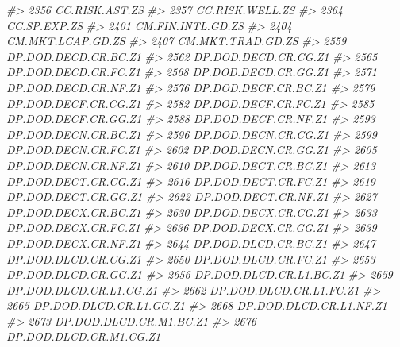 \documentclass[
]{bxjsbook}
\newenvironment{Shaded}{\begin{snugshade}}{\end{snugshade}}
\newcommand{\CommentTok}[1]{\textcolor[rgb]{0.56,0.35,0.01}{\textit{#1}}}
\theoremstyle{definition}
\theoremstyle{definition}
\theoremstyle{definition}
\theoremstyle{definition}
\theoremstyle{remark}
\begin{document}
\begin{Shaded}
\begin{Highlighting}[]
\CommentTok{\#\textgreater{} 2356              CC.RISK.AST.ZS}
\CommentTok{\#\textgreater{} 2357             CC.RISK.WELL.ZS}
\CommentTok{\#\textgreater{} 2364                CC.SP.EXP.ZS}
\CommentTok{\#\textgreater{} 2401           CM.FIN.INTL.GD.ZS}
\CommentTok{\#\textgreater{} 2404           CM.MKT.LCAP.GD.ZS}
\CommentTok{\#\textgreater{} 2407           CM.MKT.TRAD.GD.ZS}
\CommentTok{\#\textgreater{} 2559        DP.DOD.DECD.CR.BC.Z1}
\CommentTok{\#\textgreater{} 2562        DP.DOD.DECD.CR.CG.Z1}
\CommentTok{\#\textgreater{} 2565        DP.DOD.DECD.CR.FC.Z1}
\CommentTok{\#\textgreater{} 2568        DP.DOD.DECD.CR.GG.Z1}
\CommentTok{\#\textgreater{} 2571        DP.DOD.DECD.CR.NF.Z1}
\CommentTok{\#\textgreater{} 2576        DP.DOD.DECF.CR.BC.Z1}
\CommentTok{\#\textgreater{} 2579        DP.DOD.DECF.CR.CG.Z1}
\CommentTok{\#\textgreater{} 2582        DP.DOD.DECF.CR.FC.Z1}
\CommentTok{\#\textgreater{} 2585        DP.DOD.DECF.CR.GG.Z1}
\CommentTok{\#\textgreater{} 2588        DP.DOD.DECF.CR.NF.Z1}
\CommentTok{\#\textgreater{} 2593        DP.DOD.DECN.CR.BC.Z1}
\CommentTok{\#\textgreater{} 2596        DP.DOD.DECN.CR.CG.Z1}
\CommentTok{\#\textgreater{} 2599        DP.DOD.DECN.CR.FC.Z1}
\CommentTok{\#\textgreater{} 2602        DP.DOD.DECN.CR.GG.Z1}
\CommentTok{\#\textgreater{} 2605        DP.DOD.DECN.CR.NF.Z1}
\CommentTok{\#\textgreater{} 2610        DP.DOD.DECT.CR.BC.Z1}
\CommentTok{\#\textgreater{} 2613        DP.DOD.DECT.CR.CG.Z1}
\CommentTok{\#\textgreater{} 2616        DP.DOD.DECT.CR.FC.Z1}
\CommentTok{\#\textgreater{} 2619        DP.DOD.DECT.CR.GG.Z1}
\CommentTok{\#\textgreater{} 2622        DP.DOD.DECT.CR.NF.Z1}
\CommentTok{\#\textgreater{} 2627        DP.DOD.DECX.CR.BC.Z1}
\CommentTok{\#\textgreater{} 2630        DP.DOD.DECX.CR.CG.Z1}
\CommentTok{\#\textgreater{} 2633        DP.DOD.DECX.CR.FC.Z1}
\CommentTok{\#\textgreater{} 2636        DP.DOD.DECX.CR.GG.Z1}
\CommentTok{\#\textgreater{} 2639        DP.DOD.DECX.CR.NF.Z1}
\CommentTok{\#\textgreater{} 2644        DP.DOD.DLCD.CR.BC.Z1}
\CommentTok{\#\textgreater{} 2647        DP.DOD.DLCD.CR.CG.Z1}
\CommentTok{\#\textgreater{} 2650        DP.DOD.DLCD.CR.FC.Z1}
\CommentTok{\#\textgreater{} 2653        DP.DOD.DLCD.CR.GG.Z1}
\CommentTok{\#\textgreater{} 2656     DP.DOD.DLCD.CR.L1.BC.Z1}
\CommentTok{\#\textgreater{} 2659     DP.DOD.DLCD.CR.L1.CG.Z1}
\CommentTok{\#\textgreater{} 2662     DP.DOD.DLCD.CR.L1.FC.Z1}
\CommentTok{\#\textgreater{} 2665     DP.DOD.DLCD.CR.L1.GG.Z1}
\CommentTok{\#\textgreater{} 2668     DP.DOD.DLCD.CR.L1.NF.Z1}
\CommentTok{\#\textgreater{} 2673     DP.DOD.DLCD.CR.M1.BC.Z1}
\CommentTok{\#\textgreater{} 2676     DP.DOD.DLCD.CR.M1.CG.Z1}

\end{Highlighting}
\end{Shaded}
\end{document}
